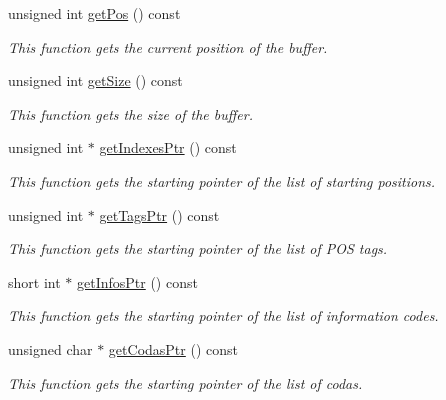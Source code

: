 \begin{CompactItemize}
unsigned int \hyperlink{classkmaOrange_1_1JEBuffer_9b038ab505a0d970bc8a8dddef62f02c}{getPos} () const 
\begin{CompactList}\small\item\em This function gets the current position of the buffer. \item\end{CompactList}\item 
unsigned int \hyperlink{classkmaOrange_1_1JEBuffer_2865cf31a9ee16e962c7c0c9aa564b32}{getSize} () const 
\begin{CompactList}\small\item\em This function gets the size of the buffer. \item\end{CompactList}\item 
unsigned int $\ast$ \hyperlink{classkmaOrange_1_1JEBuffer_636ee5050c0533db99ca8632c311389c}{getIndexesPtr} () const 
\begin{CompactList}\small\item\em This function gets the starting pointer of the list of starting positions. \item\end{CompactList}\item 
unsigned int $\ast$ \hyperlink{classkmaOrange_1_1JEBuffer_895da3d5f392bd96761102d707ac54f4}{getTagsPtr} () const 
\begin{CompactList}\small\item\em This function gets the starting pointer of the list of POS tags. \item\end{CompactList}\item 
short int $\ast$ \hyperlink{classkmaOrange_1_1JEBuffer_80d5bebfcc288edc6543e2d89c6e65a0}{getInfosPtr} () const 
\begin{CompactList}\small\item\em This function gets the starting pointer of the list of information codes. \item\end{CompactList}\item 
unsigned char $\ast$ \hyperlink{classkmaOrange_1_1JEBuffer_f7132e64eb9c4392442b8b34112ec88a}{getCodasPtr} () const 
\begin{CompactList}\small\item\em This function gets the starting pointer of the list of codas. \item\end{CompactList}\item 

\end{CompactItemize}
